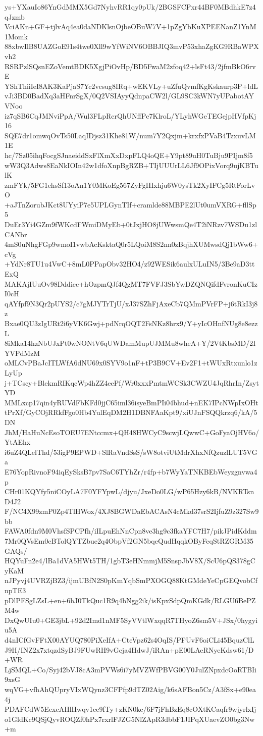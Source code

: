 ys+YXauIo86YnGdMMX5Gd7NyhvRR1qy0pUk/2BGSFCPxr44BF0MBdhkE7z4qJzmb
VciAKn+GF+tjlvAq4ea0daNDKlsnOjbeOBuW7V+1pZgYbKuXPEENanZ1YnM1Momk
88xbwIlB8UAZGoE91s4twe0Xll9wYfWiNV6OBBJIQ3mvP53xhaZgKG9RBaWPXvh2
RSRPzlSQsnEZoVemtBDK5XgjPiOvHp/BD5FwaM2zfoq42+lsFt43/2jfmBkO6rvE
YShThiiIeI8AK3KaPjaS7Yc2vcsug8IRq+wEKVLy+uZfuQvmfKgKskaurp3P+ldL
vJi3BD0BadXq3aHFnrSgX/0Q2VSIAyyQdnpaCW2l/GL9SC3kWN7yUPabotAYVNoo
iz7qSB6CqJMNviPpA/Wul3FLpRcrQhUNffPc7KlroL/YLyhWGeTEGejpHVfpKj16
SQE7dr1omwqOvTs50LaqIDjsz31Khe81W/num7Y2Qxjm+krxfxPVaB4TzxuvLM1E
hc/7Sz05ihqFocgSJnaeiddSxFlXmXxDxpFLQ4oQE+Y9pt89uH0TuBju9PIjm8f5
wW3Q3Adws8EaNkIOIn42w1dfoXnpBgRZB+TIjUUUrLL6Jf9OPixVorq9ujKBTulK
zmFYk/5FG1ehsSf13oAn1Y0MKoEg567ZyFgHIxhju6W0ysTk2XyIFCg5RtForLvO
+aJTnZorubJKct8UYyiP7e5UPLGynTIf+cramlde88MBPE2lUt0umVXRG+fllSp5
DuEr3Yi4GZm9fWKcdFWmiDMyEb+0tJxjHO8jUWwsmQe4T2iNRzv7WSDu1zlCANbr
4mS0uNhgFGp9wmoI1vwbAcKsktaQ0r5LQoiM8S2nn0zBqjhXUMwsdQj1bWw6+cVg
+YdNr8TU1u4VwC+8mL0PPapObv32HO4/z92WESik6aulxULuIN5/3Be9aD3ttExQ
MAKAjIUuOv98Dddiec+hOzpmQJf4QgMT7FVFJ3SbYwDZQNQifdFvronKuCIzI0cH
qAYfpf9N3Qr2pUYS2/c7gMJYTrTjU/xJ37SZhFjAxeCb7QMmPVrFP+j6tRkI3j8z
Bxae0QU3zIgURt2i6yVK6Gwj+pdNrqOQT2FsNKz8hrx9/Y+yIcOHnfNUg8e8ezzL
8iMka14hzNbUJxPt0wNONtV6qUWDamMupUJMMu8wheA+Y/2VtKbsMD/2IYVPdMzM
oMLCvPBaJcITLWfA6dNU69x0SYV9o1nF+tP3B9CV+Ev2F1+tWUxRtxunlo1zLyUp
j+TCscy+BlekmRIKqcWp4hZZ4eePf/Wr0xxxPmtmWCSk3CWZU4JqRhrIn/ZsytYD
MMLxcp17qin4yRUVdFbKFd0jjC65iml36isyeBmPIi04bhud+nEK7IPcNWpIxOHt
tPrXf/GyCOjRRkfFgo0Hb4YulEqDM2H1DBNFAaKpt9/xiUJnFSQQkrzq6/kA/5DN
JhM/HaHuNcEsoTOEU7ENtccmx+QH48HWCyC9scwjLQwwC+GoFyaOjHV6o/YtAEhx
i6uZ4QLelThd/53igP9EPWD+SlRaVndSsS/sW8otviUtMdrXhxNfQzuzlLUT5VGa
E76YopRivnoF94iqEySksB7pv7SaC6TYhZr/r4fp+b7WyYaTNKBEbWeyzgnvwa4p
CHr01KQYfy5niCOyLA7F0YFYpwL/djyu/JxeDo0LG/wP65Hzy6kB/NVKRTsnD4J2
F/NC4X99zmP0Zp4TlHWox/4XJ8BGWDaEbACAsN4cMkd37srS2IjfuZ9z327Sw9bb
FAWA0fdn9M0VhsfSPCPfh/iILpuEhNnCpn8ve3hg9c3fkaYFC7H7/pikJPidKddm
7Mr0QVsEm0cBTolQYTZbue2q4ObpVf2GN5bqeQudHqqkOByFcqStRZGRM35GAQs/
HQYuFn2e4/lBa1dVA5HWt5TH/1gbT3eHNmmjM5SnspJbV8X/ScU6pQS378gCyKaM
nJPyvj4UVRZjBZ3/ijmUBfN2S0pKmYqbSmPXOGQ88KtGMdeYeCpGEQvobCfnpTE3
pDlPFSgLZsL+en+6hJ0TkQuc1R9q4bNgg2ik/isKpxSdpQmKGdk/RLGU6BePZM4w
DxQwUIu0+GE3jbL+92d2Imd1nMF5SyVVtlWxqqR7THyoZ6sm5V+JSx/0hygyiu5A
d4nICfGvFFtX00AYUQ780PiXeIfA+CteVpz62s4OqIS/PFUvF6oiCLi45BquzClL
J9H/INZ2x7xtqzdSyBJ9FUwRH9vGeja4HdwJ/iRAn+pE00LAeRNyeKdsw61/D+WR
LjSMQL+Co/Syj42bVJ8cA3mPVWs6i7yMVZWfPBVG00Y0JulZNpxdcOoRTBIi9xsG
wqVG+vfhAhQUpryVIxWQynz3CFPfp9dTZ02Aig/k6sAFBon5Cz/A3fSx+e90ea4j
PDAFCdW5EexeAHlHwqv1ce9fTy+zKN0kc/6F7jFhBzEq8cOXtKCaqfr9wjyrlxIj
o1GldKc9QSjQyvROQZf0hPx7rxrlFJZG5NlZApR3dbbF1JIPqXUaevZO0bg3Nw+m
